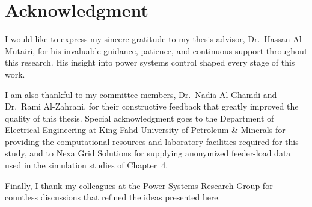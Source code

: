 \chapter*{Acknowledgment}
I would like to express my sincere gratitude to my thesis advisor, Dr.\ Hassan Al-Mutairi, for
his invaluable guidance, patience, and continuous support throughout this research. His insight
into power systems control shaped every stage of this work.

I am also thankful to my committee members, Dr.\ Nadia Al-Ghamdi and Dr.\ Rami Al-Zahrani, for
their constructive feedback that greatly improved the quality of this thesis. Special
acknowledgment goes to the Department of Electrical Engineering at King Fahd University of
Petroleum \& Minerals for providing the computational resources and laboratory facilities
required for this study, and to Nexa Grid Solutions for supplying anonymized feeder-load data
used in the simulation studies of Chapter~4.

Finally, I thank my colleagues at the Power Systems Research Group for countless discussions
that refined the ideas presented here.

\begingroup
\hypersetup{linkcolor=kfupmslate}
\tableofcontents
\newpage
\listoftables
\newpage
\listoffigures
\endgroup
